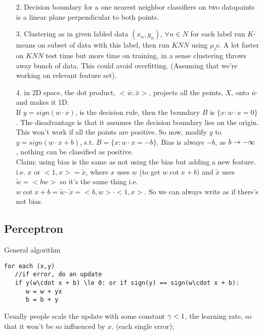 \begin{enumerate}
\item[2.] Decision boundary for a one nearest neighbor classifiers on
  two datapoints is a linear plane perpendicular to both points.
\item[3.] Clustering as in given labled data $(x_n, y_n)$, $\forall
  n\in N$ for each label run $K$-means on subset of data with this
  label, then run $KNN$ using $\mu_i$s. A lot faster on $KNN$ test
  time but more time on training,  in a sense clustering throws
  away bunch of data. This could avoid overfitting. (Assuming that
  we're working on relevant feature set).
\item[4.] in 2D space, the dot product, $<\bar w,\bar x>$, projects
  all the points, $X$, onto $\bar w$ and makes it 1D.\\
If $y=sign(w\cdot x)$, is the decision rule, then the boundary $B$ is $\{x: w\cdot x =
0\}$. The disadvantage is that it assumes the decision boundary lies
on the origin. This won't work if all the points are positive. So now,
modify $y$ to $y=sign(w\cdot x + b)$, s.t. $B=\{x:w\cdot x =
-b\}$. Bias is always $-b$, as $b\rightarrow -\infty$ , nothing can be
classified as positive.\\
Claim: using bias is the same as not using the bias but adding a new
feature. i.e. $x$ or $<1,x>=\tilde x$, where $x$ uses $w$ (to get
$w\cot x + b$) and $\tilde
x$ uses $\tilde w = <b w>$ so it's the same thing i.e. $w\cot x + b =
\tilde w \cdot \tilde x = <b,w>\cdot<1,x>$. So we can always write as
if there's not bias.
\end{enumerate}

\subsection{Perceptron}
\label{sec:perceptron}
General algorithm
\begin{verbatim}
for each (x,y)
   //if error, do an update
   if y(w\cdot x + b) \le 0: or if sign(y) == sign(w\cdot x + b):
      w = w + yx
      b = b + y
\end{verbatim}
Usually people scale the update with some constant $\gamma < 1$, the
learning rate, so that it won't be so influenced by $x$. (each single
error);


